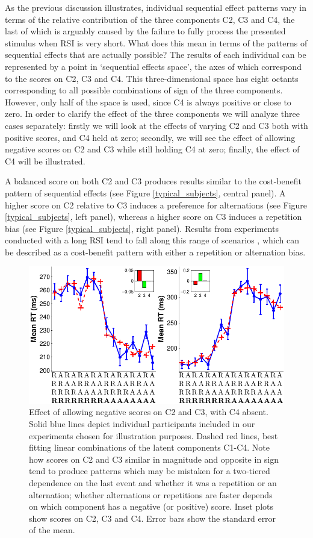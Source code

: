 \documentclass{apa}[12pt]
\begin{document}
As the previous discussion illustrates, individual sequential effect patterns vary in terms of the relative contribution of the three components C2, C3 and C4, the last of which is arguably caused by the failure to fully process the presented stimulus when RSI is very short. What does this mean in terms of the patterns of sequential effects that are actually possible? The results of each individual can be represented by a point in `sequential effects space', the axes of which correspond to the scores on C2, C3 and C4.\footnotemark{} This three-dimensional space has eight octants corresponding to all possible combinations of sign of the three components. However, only half of the space is used, since C4 is always positive or close to zero. In order to clarify the effect of the three components we will analyze three cases separately: firstly we will look at the effects of varying C2 and C3 both with positive scores, and C4 held at zero; secondly, we will see the effect of allowing negative scores on C2 and C3 while still holding C4 at zero; finally,  the effect of C4 will be illustrated.


A balanced score on both C2 and C3 produces results similar to the cost-benefit pattern of sequential effects (see Figure \ref{typical_subjects}, central panel). A higher score on C2 relative to C3 induces a preference for alternations (see Figure \ref{typical_subjects}, left panel), whereas a higher score on C3 induces a repetition bias (see Figure \ref{typical_subjects}, right panel). Results from experiments conducted with a long RSI tend to fall along this range of scenarios \cite{Soetens85,Cho02,Jones02,Gokaydin11}, which can be described as a cost-benefit pattern with either a repetition or alternation bias.

\begin{figure}[t]
\centering
\includegraphics[width=.7\textwidth]{negative.pdf}
\caption[Effect of negative scores on C2 and C3]{Effect of allowing negative scores on C2 and C3, with C4 absent. Solid blue lines depict individual participants included in our experiments chosen for illustration purposes. Dashed red lines, best fitting linear combinations of the latent components C1-C4. Note how scores on C2 and C3 similar in magnitude and opposite in sign tend to produce patterns which may be mistaken for a two-tiered dependence on the last event and whether it was a repetition or an alternation; whether alternations or repetitions are faster depends on which component has a negative (or positive) score. Inset plots show scores on C2, C3 and C4. Error bars show the standard error of the mean.}\label{negative_subjects}
\end{figure}
\end{document}
